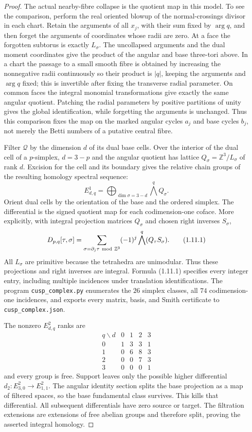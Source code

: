 \begin{proof}
The actual nearby-fibre collapse is the quotient map in this model.
To see the comparison, perform the real oriented blowup of the
normal-crossings divisor in each chart.  Retain the arguments of all
$x_j$, with their sum fixed by $\arg q$, and then forget the arguments
of coordinates whose radii are zero.  At a face the forgotten
subtorus is exactly $L_\sigma$.  The uncollapsed arguments and the
dual moment coordinates give the product of the angular and base
three-tori above.  In a chart the passage to a small smooth fibre is
obtained by increasing the nonnegative radii continuously so their
product is $|q|$, keeping the arguments and $\arg q$ fixed; this is
invertible after fixing the transverse radial parameter.  On common
faces the integral monomial transformations give exactly the same
angular quotient.  Patching the radial parameters by positive
partitions of unity gives the global identification, while forgetting
the arguments is unchanged.  Thus this comparison fixes the map on
the marked angular cycles $a_j$ and base cycles $b_j$, not merely
the Betti numbers of a putative central fibre.

Filter $\mathcal Q$ by the dimension $d$ of its dual base cells.
Over the interior of the dual cell of a $p$-simplex, $d=3-p$ and the
angular quotient has lattice
$Q_\sigma=\mathbb Z^3/L_\sigma$ of rank $d$.
Excision for the cell and its boundary gives the relative chain
groups of the resulting homology spectral sequence:
\[
E^1_{d,q}=\bigoplus_{\dim\sigma=3-d}\bigwedge^qQ_\sigma.
\]
Orient dual cells by the orientation of the base and the ordered
simplex.  The differential is the signed quotient map for each
codimension-one coface.  More explicitly, with integral projection
matrices $Q_\sigma$ and chosen right inverses $S_\sigma$,
\[
D_{p,q}[\tau,\sigma]=
 \sum_{\sigma=\partial_j\tau\ {\rm mod}\ \mathbb Z^3}
 (-1)^j\bigwedge^q(Q_\tau S_\sigma).
\tag{1.11.1}
\]
All $L_\sigma$ are primitive because the tetrahedra are unimodular.
Thus these projections and right inverses are integral.  Formula
(1.11.1) specifies every integer entry, including multiple incidences
under translation identifications.  The program
\texttt{cusp\_complex.py} enumerates the $26$ simplex classes, all
$74$ codimension-one incidences, and exports every matrix, basis, and
Smith certificate to \texttt{cusp\_complex.json}.

The nonzero $E^2_{d,q}$ ranks are
\[
\begin{array}{c|rrrr}
q\backslash d&0&1&2&3\\\hline
0&1&3&3&1\\
1&0&6&8&3\\
2&0&0&7&3\\
3&0&0&0&1
\end{array}
\]
and every group is free.  Support leaves only the possible higher
differential $d_2:E^2_{3,0}\to E^2_{1,1}$.
The angular identity section splits the base projection as a map of
filtered spaces, so the base fundamental class survives.  This kills
that differential.  All subsequent differentials have zero source or
target.  The filtration extensions are extensions of free abelian
groups and therefore split, proving the asserted integral homology.


\end{proof}

